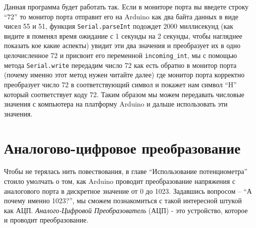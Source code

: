 \documentclass[a4paper,twoside]{book}
\begin{document}
Данная программа будет работать так. Если в мониторе порта вы введете строку
``72'' то монитор порта отправит его на Arduino как два байта данных в виде
чисел 55 и 51, функция \texttt{Serial.parseInt} подождет 2000 миллисекунд (как
видите я поменял время ожидание с 1 секунды на 2 секунды, чтобы нагляднее
показать кое какие аспекты) увидит эти два значения и преобразует их в одно
целочисленное 72 и присвоит его переменной \texttt{incoming\_int}, мы с помощью
метода \texttt{Serial.write} передадим число 72 как есть обратно в монитор порта
(почему именно этот метод нужен читайте далее) где монитор порта корректно
преобразует число 72 в соответствующий символ и покажет нам символ ``H'' который
соответствует коду 72. Таким образом мы можем передавать числовые значения с
компьютера на платформу Arduino и дальше использовать эти значения.

\chapter{Аналогово-цифровое преобразование}

Чтобы не терялась нить повествования, в главе ``Использование потенциометра''
стоило умолчать о том, как Arduino проводит преобразование напряжения с
аналогового порта в дискретное значение от 0 до 1023. Задавшись вопросом -- ``А
почему именно 1023?'', мы сможем познакомиться с такой интересной штукой как
АЦП. \emph{Аналого-Цифровой Преобразователь} (АЦП) - это устройство, которое и
проводит преобразование.
\end{document}
